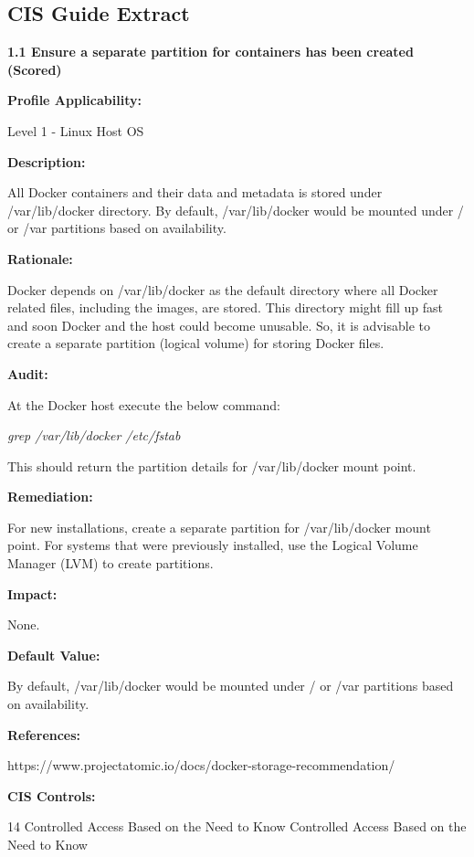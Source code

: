 \documentclass{article}
\begin{document}
\subsection{CIS Guide Extract}
\label{appendix:cis}
\textbf{1.1 Ensure a separate partition for containers has been created (Scored)}

\textbf{Profile Applicability:}

Level 1 - Linux Host OS 

\textbf{Description:}

All Docker containers and their data and metadata is stored under /var/lib/docker directory. By default, /var/lib/docker would be mounted under / or /var partitions based on availability.

\textbf{Rationale:}

Docker depends on /var/lib/docker as the default directory where all Docker related files, including the images, are stored. This directory might fill up fast and soon Docker and the host could become unusable. So, it is advisable to create a separate partition (logical volume) for storing Docker files.

\textbf{Audit:}

At the Docker host execute the below command:

\textit{grep /var/lib/docker /etc/fstab}

This should return the partition details for /var/lib/docker mount point. 

\textbf{Remediation:}

For new installations, create a separate partition for /var/lib/docker mount point. For systems that were previously installed, use the Logical Volume Manager (LVM) to create partitions.

\textbf{Impact:}

None.

\textbf{Default Value:}

By default, /var/lib/docker would be mounted under / or /var partitions based on availability.

\textbf{References:}

https://www.projectatomic.io/docs/docker-storage-recommendation/

\textbf{CIS Controls:}

14 Controlled Access Based on the Need to Know Controlled Access Based on the Need to Know

\newpage

\end{document}
